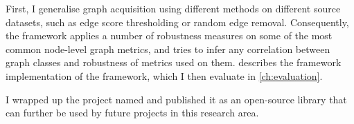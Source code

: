 First, I generalise graph acquisition using different methods on different source datasets, such as edge score thresholding or random edge removal.
Consequently, the framework applies a number of robustness measures on some of the most common node-level graph metrics, and tries to infer any correlation between graph classes and robustness of metrics used on them.
 describes the framework implementation of the framework, which I then evaluate in \cref{ch:evaluation}.



I wrapped up the project named \graffs and published it as an open-source library that can further be used by future projects in this research area.
